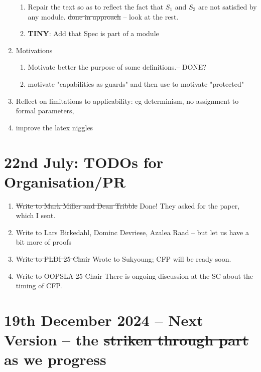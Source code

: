 \documentclass[acmsmall,review,anonymous]{acmart}\settopmatter{printfolios=true}
\begin{document}
\begin{enumerate}
\begin{enumerate}
\item
Repair the text so as to reflect the fact that $S_1$ and $S_3$ are not satisfied by any module. {\st{done in approach}} -- look at the rest.

\item
\textbf{TINY}:  Add that Spec is part of a module

 \end{enumerate}

\item
Motivations 

\begin{enumerate}
\item
Motivate better the purpose of some definitions.-- 
DONE? 
\item
motivate "capabilities as guards" and then use to motivate "protected"
\end{enumerate}
 
\item
Reflect on limitations to applicability: eg determinism, no assignment to formal parameters, 



\item
improve the latex niggles 
 


\end{enumerate}

\section{22nd  July: TODOs for Organisation/PR}

 
\begin{enumerate}
\item
\st{Write to Mark Miller and Dean Tribble} Done! They asked for the paper, which I sent.
\item
Write to Lars Birkedahl, Dominc Devriese, Azalea Raad -- but let us have a bit more of proofs
\item
\st{Write to PLDI 25 Chair} Wrote to Sukyoung; CFP will be ready soon.
\item
\st{Write to OOPSLA 25 Chair} There is ongoing discussion at the SC about the timing of CFP.

\end{enumerate}

\section{19th December 2024 -- Next Version -- the \st{striken through part} as we progress}
\end{document}

